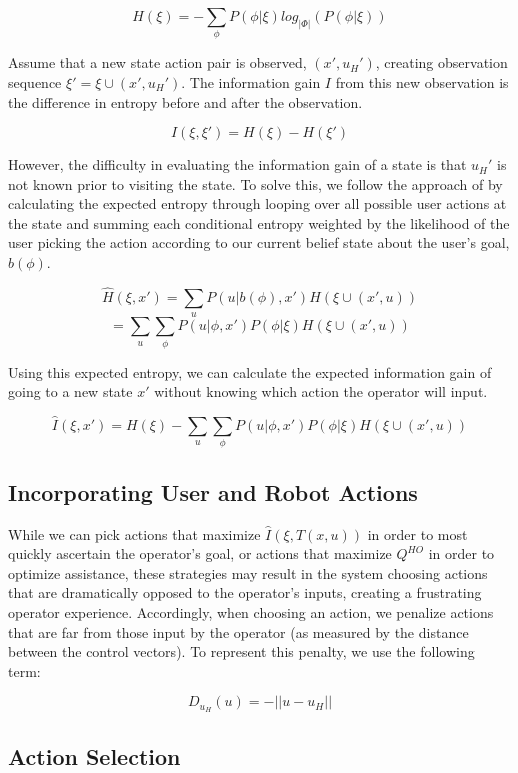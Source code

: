 \documentclass[conference]{IEEEtran}
\begin{document}
\[
H(\xi) = -\sum_\phi P(\phi|\xi)log_{|\Phi|}(P(\phi|\xi))
\]

Assume that a new state action pair is observed, $(x',u_H')$, creating observation sequence $\xi' = \xi \cup (x', u_H')$. The information gain $I$ from this new observation is the difference in entropy before and after the observation.

\[
I(\xi, \xi') = H(\xi) - H(\xi')
\]

However, the difficulty in evaluating the information gain of a state is that $u_H'$ is not known prior to visiting the state. To solve this, we follow the approach of \citet{holub2008entropy} by calculating the expected entropy through looping over all possible user actions at the state and summing each conditional entropy weighted by the likelihood of the user picking the action according to our current belief state about the user's goal, $b(\phi)$.

\[
\hat{H}(\xi, x') = \sum_u P(u|b(\phi),x')H(\xi \cup (x', u))
\]
\[
= \sum_u \sum_\phi P(u|\phi,x')P(\phi|\xi)H(\xi \cup (x', u))
\]

Using this expected entropy, we can calculate the expected information gain of going to a new state $x'$ without knowing which action the operator will input.

\[
\hat{I}(\xi, x') = H(\xi) - \sum_u \sum_\phi P(u|\phi,x')P(\phi|\xi)H(\xi \cup (x', u))
\]

\subsection{Incorporating User and Robot Actions}
While we can pick actions that maximize $\hat{I}(\xi, T(x,u))$ in order to most quickly ascertain the operator's goal, or actions that maximize $Q^{HO}$ in order to optimize assistance, these strategies may result in the system choosing actions that are dramatically opposed to the operator's inputs, creating a frustrating operator experience. Accordingly, when choosing an action, we penalize actions that are far from those input by the operator (as measured by the distance between the control vectors). To represent this penalty, we use the following term:

\[
D_{u_H}(u) = -||u - u_H||
\]


\subsection{Action Selection}
\end{document}
